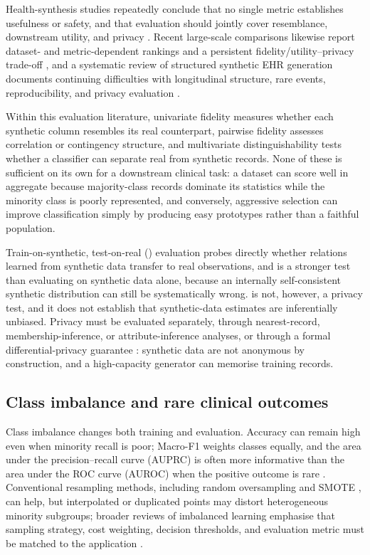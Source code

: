 Health-synthesis studies repeatedly conclude that no single metric establishes usefulness or safety, and that evaluation should jointly cover resemblance, downstream utility, and privacy \citep{goncalves2020,hernandez2023,pezoulas2024}. Recent large-scale comparisons likewise report dataset- and metric-dependent rankings and a persistent fidelity/utility--privacy trade-off \citep{hernandez2025,nanevski2026}, and a systematic review of structured synthetic EHR generation documents continuing difficulties with longitudinal structure, rare events, reproducibility, and privacy evaluation \citep{ghosheh2024}.

Within this evaluation literature, univariate fidelity measures whether each synthetic column resembles its real counterpart, pairwise fidelity assesses correlation or contingency structure, and multivariate distinguishability tests whether a classifier can separate real from synthetic records. None of these is sufficient on its own for a downstream clinical task: a dataset can score well in aggregate because majority-class records dominate its statistics while the minority class is poorly represented, and conversely, aggressive selection can improve classification simply by producing easy prototypes rather than a faithful population.

Train-on-synthetic, test-on-real (\tstr{}) evaluation probes directly whether relations learned from synthetic data transfer to real observations, and is a stronger test than evaluating on synthetic data alone, because an internally self-consistent synthetic distribution can still be systematically wrong. \tstr{} is not, however, a privacy test, and it does not establish that synthetic-data estimates are inferentially unbiased. Privacy must be evaluated separately, through nearest-record, membership-inference, or attribute-inference analyses, or through a formal differential-privacy guarantee \citep{yale2019,dwork2006}: synthetic data are not anonymous by construction, and a high-capacity generator can memorise training records.

\subsection{Class imbalance and rare clinical outcomes}

Class imbalance changes both training and evaluation. Accuracy can remain high even when minority recall is poor; Macro-F1 weights classes equally, and the area under the precision--recall curve (AUPRC) is often more informative than the area under the ROC curve (AUROC) when the positive outcome is rare \citep{saito2015}. Conventional resampling methods, including random oversampling and SMOTE \citep{chawla2002}, can help, but interpolated or duplicated points may distort heterogeneous minority subgroups; broader reviews of imbalanced learning emphasise that sampling strategy, cost weighting, decision thresholds, and evaluation metric must be matched to the application \citep{he2009}.

